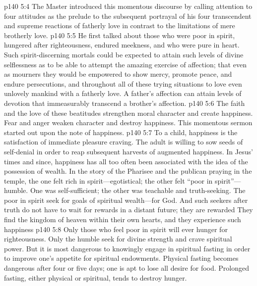 \pc \vs p140 5:4 The Master introduced this momentous discourse by calling attention to four  attitudes as the prelude to the subsequent portrayal of his four transcendent and supreme reactions of fatherly love in contrast to the limitations of mere brotherly love.
\vs p140 5:5 He first talked about those who were poor in spirit, hungered after righteousness, endured meekness, and who were pure in heart. Such spirit\hyp{}discerning mortals could be expected to attain such levels of divine selflessness as to be able to attempt the amazing exercise of  affection; that even as mourners they would be empowered to show mercy, promote peace, and endure persecutions, and throughout all of these trying situations to love even unlovely mankind with a fatherly love. A father’s affection can attain levels of devotion that immeasurably transcend a brother’s affection.
\vs p140 5:6 The faith and the love of these beatitudes strengthen moral character and create happiness. Fear and anger weaken character and destroy happiness. This momentous sermon started out upon the note of happiness.
\pc \vs p140 5:7 \bibnobreakspace {} To a child, happiness is the satisfaction of immediate pleasure craving. The adult is willing to sow seeds of self\hyp{}denial in order to reap subsequent harvests of augmented happiness. In Jesus’ times and since, happiness has all too often been associated with the idea of the possession of wealth. In the story of the Pharisee and the publican praying in the temple, the one felt rich in spirit---egotistical; the other felt “poor in spirit”---humble. One was self\hyp{}sufficient; the other was teachable and truth\hyp{}seeking. The poor in spirit seek for goals of spiritual wealth---for God. And such seekers after truth do not have to wait for rewards in a distant future; they are rewarded  They find the kingdom of heaven within their own hearts, and they experience such happiness 
\pc \vs p140 5:8 \bibnobreakspace {} Only those who feel poor in spirit will ever hunger for righteousness. Only the humble seek for divine strength and crave spiritual power. But it is most dangerous to knowingly engage in spiritual fasting in order to improve one’s appetite for spiritual endowments. Physical fasting becomes dangerous after four or five days; one is apt to lose all desire for food. Prolonged fasting, either physical or spiritual, tends to destroy hunger.
